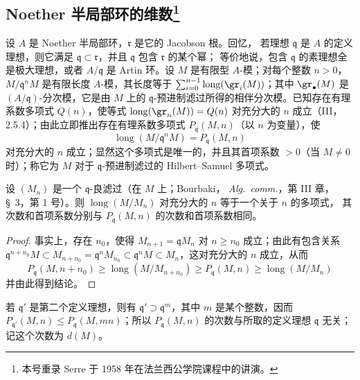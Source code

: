 \subsection[Noether 半局部环的维数]{Noether 半局部环的维数\protect\footnote{本号重录
Serre 于 1958 年在法兰西公学院课程中的讲演。}}
\label{subsection:0.16.2-fr}

\begin{env}[16.2.1]
\label{0.16.2.1-fr}
设 $A$ 是 Noether 半局部环，$\mathfrak{r}$ 是它的 Jacobson 根。回忆，
若理想 $\mathfrak{q}$ 是 $A$ 的定义理想，则它满足
$\mathfrak{q}\subset\mathfrak{r}$，并且 $\mathfrak{q}$ 包含
$\mathfrak{r}$ 的某个幂；
等价地说，包含 $\mathfrak{q}$ 的素理想全是极大理想，或者
$A/\mathfrak{q}$ 是 Artin 环。设 $M$ 是有限型 $A$-模；对每个整数
$n>0$，$M/\mathfrak{q}^nM$ 是有限长度 $A$-模，其长度等于
$\sum_{i=0}^{n-1}\operatorname{long}(\gr_i(M))$；其中
$\gr_\bullet(M)$ 是 $(A/\mathfrak{q})$-分次模，它是由 $M$ 上的
$\mathfrak{q}$-预进制滤过所得的相伴分次模。已知存在有理系数多项式
$Q(n)$，使等式 $\operatorname{long}(\gr_n(M))=Q(n)$ 对充分大的 $n$
成立（III，2.5.4）；由此立即推出存在有理系数多项式
$P_{\mathfrak{q}}(M,n)$（以 $n$ 为变量），使
\[
  \operatorname{long}(M/\mathfrak{q}^nM)=P_{\mathfrak{q}}(M,n)
\]
对充分大的 $n$ 成立；显然这个多项式是唯一的，并且其首项系数
$>0$（当 $M\neq0$ 时）；称它为 $M$ 对于 $\mathfrak{q}$-预进制滤过的
Hilbert--Samuel 多项式。
\end{env}

\begin{lemma}[16.2.2.1]
\label{0.16.2.2.1-fr}
设 $(M_n)$ 是一个 $\mathfrak{q}$-良滤过（在 $M$ 上；Bourbaki，
\emph{Alg.~comm.}，第 III 章，\S~3，第 1 号）。则
$\operatorname{long}(M/M_n)$ 对充分大的 $n$ 等于一个关于 $n$ 的多项式，
其次数和首项系数分别与 $P_{\mathfrak{q}}(M,n)$ 的次数和首项系数相同。
\end{lemma}

\begin{proof}
事实上，存在 $n_0$，使得 $M_{n+1}=\mathfrak{q}M_n$ 对
$n\geq n_0$ 成立；由此有包含关系
$\mathfrak{q}^{n+n_0}M\subset M_{n+n_0}=\mathfrak{q}^nM_{n_0}
\subset\mathfrak{q}^nM\subset M_n$，这对充分大的 $n$ 成立，从而
\[
  P_{\mathfrak{q}}(M,n+n_0)\geq
  \operatorname{long}(M/M_{n+n_0})\geq
  P_{\mathfrak{q}}(M,n)\geq\operatorname{long}(M/M_n)
\]
并由此得到结论。
\end{proof}

若 $\mathfrak{q}'$ 是第二个定义理想，则有
$\mathfrak{q}'\supset\mathfrak{q}^m$，其中 $m$ 是某个整数，因而
$P_{\mathfrak{q}'}(M,n)\leq P_{\mathfrak{q}}(M,mn)$；所以
$P_{\mathfrak{q}}(M,n)$ 的次数与所取的定义理想 $\mathfrak{q}$ 无关；
记这个次数为 $d(M)$。

